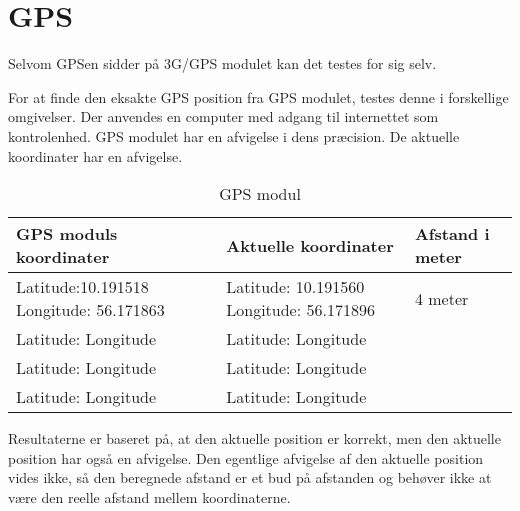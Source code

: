 \section{GPS}

Selvom GPSen sidder på 3G/GPS modulet kan det testes for sig selv. 

For at finde den eksakte GPS position fra GPS modulet, testes denne i forskellige omgivelser. Der anvendes en computer med adgang til internettet som kontrolenhed. 
GPS modulet har en afvigelse i dens præcision. 
De aktuelle koordinater har en afvigelse. 
\begin{table}[H]
\begin{tabular}{| p{4cm}| p{4cm}| p{3cm}|}
\hline
GPS moduls koordinater & Aktuelle koordinater & Afstand i meter\\\hline
Latitude:10.191518 \newline Longitude: 56.171863 & Latitude: 10.191560 \newline Longitude: 56.171896 & 4 meter\\\hline
Latitude: \newline Longitude & Latitude: \newline Longitude & \\\hline
Latitude: \newline Longitude & Latitude: \newline Longitude & \\\hline
Latitude: \newline Longitude & Latitude: \newline Longitude & \\\hline

\end{tabular}
\caption{GPS modul}
\label{tab:GPS_modul}
\end{table}




Resultaterne er baseret på, at den aktuelle position er korrekt, men den aktuelle position har også en afvigelse. Den egentlige afvigelse af den aktuelle position vides ikke, så den beregnede afstand er et bud på afstanden og behøver ikke at være den reelle afstand mellem koordinaterne.

